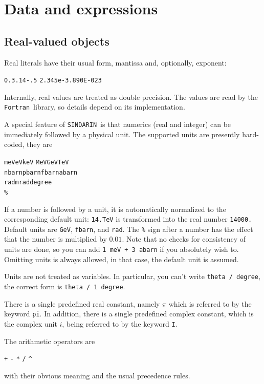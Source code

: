 \documentclass[12pt]{book}
\newcommand{\ttt}[1]{\texttt{#1}}
\newcommand{\sindarin}{\ttt{SINDARIN}}
\newcommand{\fortran}{\ttt{Fortran}}
\begin{document}
\section{Data and expressions}

\subsection{Real-valued objects}
\label{sec:real}

Real literals have their usual form, mantissa and, optionally, exponent:
\begin{center}
\ttt{0.}\quad  \ttt{3.14}\quad \ttt{-.5}\quad
\ttt{2.345e-3}\quad \ttt{.890E-023}
\end{center}
Internally, real values are treated as double precision.  The values are read
by the \fortran\ library, so details depend on its implementation.

A special feature of \sindarin\ is that numerics (real and integer) can be
immediately followed by a physical unit.  The supported units are presently
hard-coded, they are
\begin{center}
  \ttt{meV}\quad \ttt{eV}\quad \ttt{keV}\quad
  \ttt{MeV}\quad \ttt{GeV}\quad \ttt{TeV}
\\
  \ttt{nbarn}\quad \ttt{pbarn}\quad \ttt{fbarn}\quad \ttt{abarn}
\\
  \ttt{rad}\quad \ttt{mrad}\quad \ttt{degree}
\\
  \ttt{\%}
\end{center}
If a number is followed by a unit, it is automatically normalized to the
corresponding default unit: \ttt{14.TeV} is transformed into the real number
\ttt{14000.}  Default units are \ttt{GeV}, \ttt{fbarn}, and \ttt{rad}.  The
\ttt{\%} sign after a number has the effect that the number is multiplied by
$0.01$.  Note that no checks for consistency of units are done, so you can add
\ttt{1 meV + 3 abarn} if you absolutely wish to.  Omitting units is always
allowed, in that case, the default unit is assumed.

Units are not treated as variables.  In particular, you can't write \ttt{theta
  / degree}, the correct form is \ttt{theta / 1 degree}.

There is a single predefined real constant, namely $\pi$ which is referred to
by the keyword \ttt{pi}. In addition, there is a single predefined
complex constant, which is the complex unit $i$, being referred to by
the keyword \ttt{I}.

The arithmetic operators are
\begin{center}
  \verb|+| \verb|-| \verb|*| \verb|/| \verb|^|
\end{center}
with their obvious meaning and the usual precedence rules.
\end{document}
